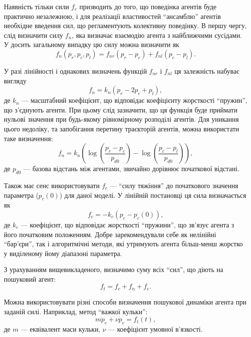 \documentclass[a4paper,13pt]{atuaref}
\begin{document}
Наявність тільки сили $f_e$ призводить до того, що поведінка агентів буде
практично незалежною, і для реалізації властивостей ``ансамблю'' агентів
необхідне введення сил, що регламентують колективну поведінку. В першу чергу,
слід визначити силу $f_n$, яка визначає взаємодію агента з найближчими
сусідами. У досить загальному випадку цю силу можна визначити як
%
\begin{equation}
  f_n( p_r, p_c, p_l ) = f_{nr}(p_r-p_c) + f_{nl}(p_c-p_l).
  \label{atu:eq:f_n_gen}
\end{equation}

У разі лінійності і однакових визначень функцій $f_{nr}$ і $f_{nl}$ ця залежність набуває вигляду
%
\begin{equation}
  f_n = k_n ( p_r - 2 p_c + p_l ),
  \label{atu:eq:f_n_lin}
\end{equation}
%
де $k_n$ --- масштабний коефіцієнт, що відповідає коефіцієнту жорсткості
``пружин'', що з'єднують агенти. При цьому слід зазначити, що ця функція буде
приймати нульові значення при будь-якому рівномірному розподілі агентів.
Для уникання цього недоліку, та запобігання перетину траєкторій агентів,
можна використати таке визначення:
%
\begin{equation}
  f_n = k_n \left( \log\left( \frac{p_r-p_c}{p_{d0}} \right) -  \log\left( \frac{p_c-p_l}{p_{d0}}\right) \right),
  \label{atu:eq:f_n_log}
\end{equation}
%
де
$p_{d0}$ ---
базова відстань між агентами, звичайно дорівнює початкової відстані.

Також має сенс використовувати $f_c$ --- ``силу тяжіння'' до початкового значення параметра
($p_{c}(0)$) для даної моделі. У лінійній постановці ця сила визначається як
%
\begin{equation}
  f_c = -k_c (p_c - p_{c}(0)) ,
  \label{atu:eq:f_c}
\end{equation}
%
де $k_c$ --- коефіцієнт, що відповідає жорсткості ``пружини'',
що зв'язує агента з його початковим положенням.
Добре зарекомендували себе як нелінійні ``бар'єри'',
так і алгоритмічні методи, які утримують агента
більш-менш жорстко у виділеному йому діапазоні параметра.

З урахуванням вищевикладеного, визначимо суму всіх ``сил'',
що діють на пошуковий агент:
\begin{equation}
  f_t = f_c + f_n + f_e .
  \label{atu:eq:f_t}
\end{equation}


Можна використовувати різні способи визначення пошукової динаміки агента при
заданій силі. Наприклад, метод ``важкої кульки'':
\begin{equation}
  m \ddot{p}_c + \nu \dot{p}_c = f_t(t),
  \label{atu:eq:heavy_ball}
\end{equation}
%
де $m$ --- еквівалент маси кульки, $\nu$ --- коефіцієнт умовної в'язкості.
\end{document}
